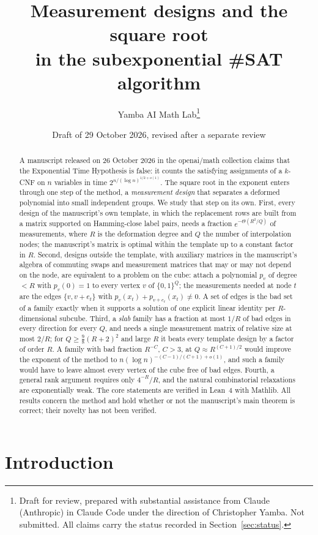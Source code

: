 \documentclass[11pt]{article}
\title{Measurement designs and the square root\\in the subexponential \#SAT algorithm}
\author{Yamba AI Math Lab\thanks{Draft for review, prepared with substantial assistance from Claude (Anthropic) in Claude Code under the direction of Christopher Yamba. Not submitted. All claims carry the status recorded in Section~\ref{sec:status}.}}
\date{Draft of 29 October 2026, revised after a separate review}
\theoremstyle{definition}
\theoremstyle{remark}
\begin{document}
\maketitle

\begin{abstract}
A manuscript released on 26 October 2026 in the openai/math collection claims that the Exponential Time Hypothesis is false: it counts the satisfying assignments of a $k$-CNF on $n$ variables in time $2^{n/(\log n)^{1/2+o(1)}}$. The square root in the exponent enters through one step of the method, a \emph{measurement design} that separates a deformed polynomial into small independent groups. We study that step on its own. First, every design of the manuscript's own template, in which the replacement rows are built from a matrix supported on Hamming-close label pairs, needs a fraction $e^{-\Theta(R^2/Q)}$ of measurements, where $R$ is the deformation degree and $Q$ the number of interpolation nodes; the manuscript's matrix is optimal within the template up to a constant factor in $R$. Second, designs outside the template, with auxiliary matrices in the manuscript's algebra of commuting swaps and measurement matrices that may or may not depend on the node, are equivalent to a problem on the cube: attach a polynomial $p_v$ of degree $<R$ with $p_v(0)=1$ to every vertex $v$ of $\{0,1\}^Q$; the measurements needed at node $t$ are the edges $\{v,v+e_t\}$ with $p_v(x_t)+p_{v+e_t}(x_t)\ne0$. A set of edges is the bad set of a family exactly when it supports a solution of one explicit linear identity per $R$-dimensional subcube. Third, a \emph{slab} family has a fraction at most $1/R$ of bad edges in every direction for every $Q$, and needs a single measurement matrix of relative size at most $2/R$; for $Q\ge\frac98(R+2)^2$ and large $R$ it beats every template design by a factor of order $R$. A family with bad fraction $R^{-C}$, $C>3$, at $Q\approx R^{(C+1)/2}$ would improve the exponent of the method to $n(\log n)^{-(C-1)/(C+1)+o(1)}$, and such a family would have to leave almost every vertex of the cube free of bad edges. Fourth, a general rank argument requires only $4^{-R}/R$, and the natural combinatorial relaxations are exponentially weak. The core statements are verified in Lean~4 with Mathlib. All results concern the method and hold whether or not the manuscript's main theorem is correct; their novelty has not been verified.
\end{abstract}

\section{Introduction}
\end{document}
